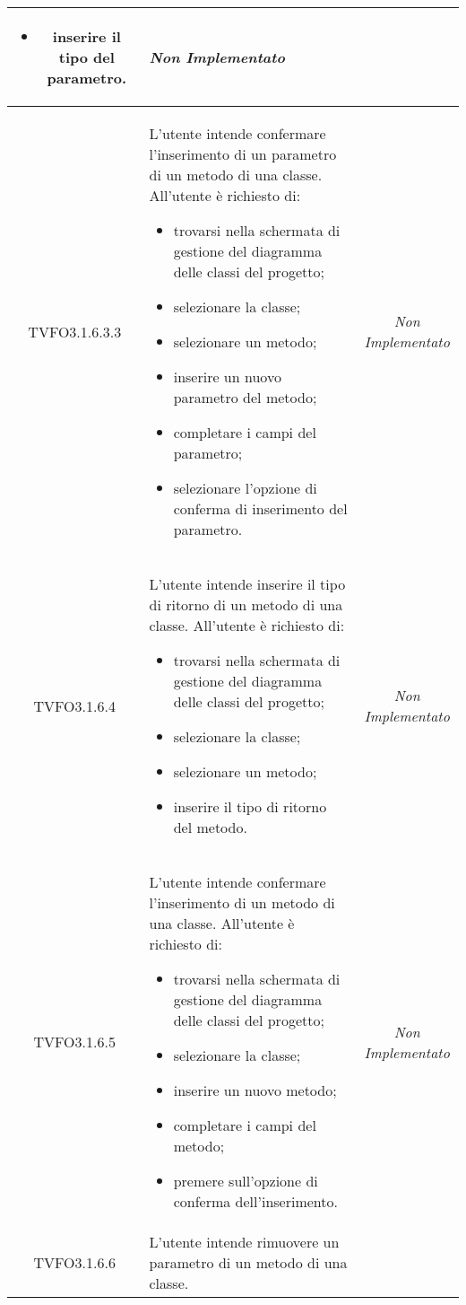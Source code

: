 \begin{longtable}{|c|>{}m{8cm}|c|}
\begin{itemize}
\item inserire il tipo del parametro.
\end{itemize} & \textit{Non Implementato}\\ \hline
\hypertarget{TVFO3.1.6.3.3}{TVFO3.1.6.3.3} & L'utente intende confermare l'inserimento di un parametro di un metodo di una classe.
All'utente è richiesto di:
\begin{itemize}
\item trovarsi nella schermata di gestione del diagramma delle classi del progetto;
\item selezionare la classe;
\item selezionare un metodo;
\item inserire un nuovo parametro del metodo;
\item completare i campi del parametro;
\item selezionare l'opzione di conferma di inserimento del parametro.
\end{itemize} & \textit{Non Implementato}\\ \hline
\hypertarget{TVFO3.1.6.4}{TVFO3.1.6.4} & L'utente intende inserire il tipo di ritorno di un metodo di una classe.
All'utente è richiesto di:
\begin{itemize}
\item trovarsi nella schermata di gestione del diagramma delle classi del progetto;
\item selezionare la classe;
\item selezionare un metodo;
\item inserire il tipo di ritorno del metodo.
\end{itemize} & \textit{Non Implementato}\\ \hline
\hypertarget{TVFO3.1.6.5}{TVFO3.1.6.5} & L'utente intende confermare l'inserimento di un metodo di una classe. 
All'utente è richiesto di: 
\begin{itemize} 
\item trovarsi nella schermata di gestione del diagramma delle classi del progetto; 
\item selezionare la classe; 
\item inserire un nuovo metodo; 
\item completare i campi del metodo;
\item premere sull'opzione di conferma dell'inserimento.  
\end{itemize} & \textit{Non Implementato}\\ \hline
\hypertarget{TVFO3.1.6.6}{TVFO3.1.6.6} & L'utente intende rimuovere un parametro di un metodo di una classe.

\end{longtable}
